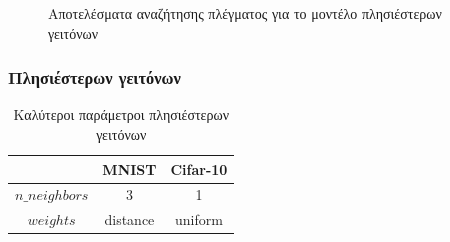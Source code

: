 \documentclass{beamer}
\begin{document}
\begin{frame}
\begin{figure}[H]
    \caption{Αποτελέσματα αναζήτησης πλέγματος για το μοντέλο πλησιέστερων
    γειτόνων}
    \label{fig:cv_knn}
\end{figure}

\end{frame}

\begin{frame}
\frametitle{Πλησιέστερων γειτόνων}

\begin{table}[h]
\centering
\begin{tabular}{|c|c|c|}
\hline
               & MNIST    & Cifar-10 \\ \hline
$n\_neighbors$ & 3        & 1        \\ \hline
$weights$      & distance & uniform  \\ \hline
\end{tabular}
\caption{Καλύτεροι παράμετροι πλησιέστερων γειτόνων}
\label{tab:best_knn}
\end{table}

\end{frame}
\end{document}
